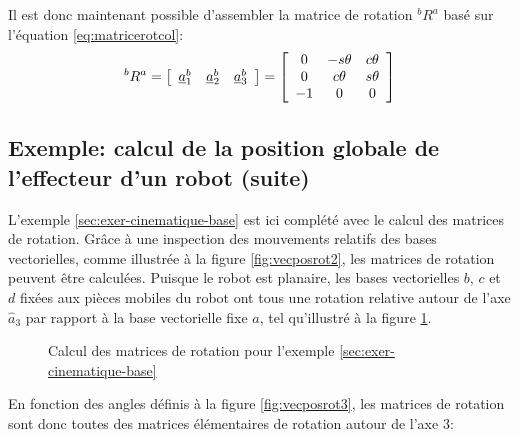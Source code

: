 Il est donc maintenant possible d'assembler la matrice de rotation $^bR^a$ basé sur l'équation \eqref{eq:matricerotcol}:
\begin{align}
^bR^a =\left[ \begin{array}{c c c}
	\underline{a}_1^b  & \underline{a}_2^b & \underline{a}_3^b
\end{array}  \right]
= \left[ \begin{array}{c c c}
	0 & -s\theta & c\theta \\
	0 & c\theta & s\theta \\
-1 & 0 & 0 
\end{array}  \right]
\end{align}

\subsection{Exemple: calcul de la position globale de l'effecteur d'un robot (suite) }
\label{sec:exer-cinematique-base2}
%
L'exemple \ref{sec:exer-cinematique-base} est ici complété avec le calcul des matrices de rotation. Grâce à une inspection des mouvements relatifs des bases vectorielles, comme illustrée à la figure \ref{fig:vecposrot2}, les matrices de rotation peuvent être calculées. Puisque le robot est planaire, les bases vectorielles $b$, $c$ et $d$ fixées aux pièces mobiles du robot ont tous une rotation relative autour de l'axe $\hat{a}_3$ par rapport à la base vectorielle fixe $a$, tel qu'illustré à la figure \ref{fig:exer-cinematique-base-rotation}.  
%
\begin{figure}[H]
        \centering
				\hspace{10pt}
				\hspace{10pt}
        \caption{Calcul des matrices de rotation pour l'exemple \ref{sec:exer-cinematique-base}}
				\label{fig:exer-cinematique-base-rotation}
\end{figure}
%
En fonction des angles définis à la figure \ref{fig:vecposrot3}, les matrices de rotation sont donc toutes des matrices élémentaires de rotation autour de l'axe 3:
